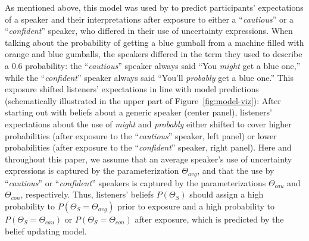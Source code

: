 \documentclass[man,floatsintext]{apa6}
\begin{document}
As mentioned above, this model was used by   to predict participants' expectations of a speaker and their interpretations after exposure to either a ``\textit{cautious}'' or a ``\textit{confident}'' speaker, who  differed in their use of uncertainty expressions.  When talking about the probability of getting a blue gumball from a machine filled with orange and blue gumballs,  the speakers differed in the term they used to describe a 0.6 probability: the ``\textit{cautious}'' speaker always said  ``You \textit{might} get a blue one,'' while the ``\textit{confident}'' speaker always said ``You'll \textit{probably} get a blue one.'' This exposure shifted listeners' expectations in line with model predictions (schematically illustrated in the upper part of Figure~\ref{fig:model-viz}): After starting out with  beliefs about a generic speaker (center panel), listeners' expectations about the use of \textit{might} and \textit{probably} either shifted to cover higher probabilities (after exposure to the ``\textit{cautious}'' speaker, left panel) or lower probabilities (after exposure to the ``\textit{confident}'' speaker, right panel). Here and throughout this paper, we assume that an average speaker's use of uncertainty expressions is captured by the parameterization $\Theta_{avg}$, and that the use by ``\textit{cautious}'' or ``\textit{confident}'' speakers is captured by the parameterizations $\Theta_{cau}$ and $\Theta_{con}$, respectively. Thus, listeners' beliefs $P(\Theta_S)$ should assign a high probability to $P(\Theta_S = \Theta_{avg})$ prior to exposure and a high probability to $P(\Theta_S = \Theta_{cau})$ or $P(\Theta_S = \Theta_{con})$ after exposure, which is predicted by the belief updating model.
\end{document}
